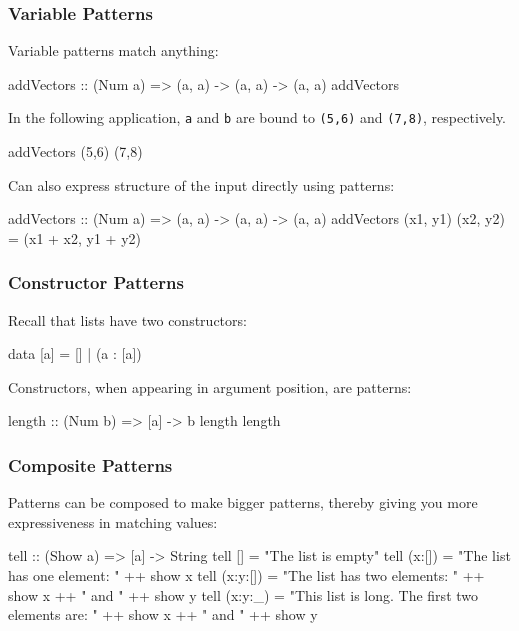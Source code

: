 \documentclass{beamer}
\newenvironment{codeblock}[1][.8]{%
\begin{columns}
\begin{column}{#1\linewidth}
\begin{exampleblock}{}}{%
\end{exampleblock}
\end{column}
\end{columns}}
\begin{document}
\begin{frame}[fragile]
\frametitle{Variable Patterns}

Variable patterns match anything:
\begin{hcode}
addVectors :: (Num a) => (a, a) -> (a, a) -> (a, a)  
addVectors %
\end{hcode}

\pause
\vfill
In the following application, \verb+a+ and \verb+b+ are bound to
 \verb+(5,6)+ and \verb+(7,8)+, respectively.
\begin{hcode}
addVectors (5,6) (7,8) 
\end{hcode}
\vfill

\pause 
Can also express structure of the input directly using patterns:
\begin{hcode}
addVectors :: (Num a) => (a, a) -> (a, a) -> (a, a)  
addVectors (x1, y1) (x2, y2) = (x1 + x2, y1 + y2)  
\end{hcode}

\end{frame}

\begin{frame}[fragile]
\frametitle{Constructor Patterns}

Recall that lists have two constructors:
\begin{hcode}
data [a] = [] | (a : [a])
\end{hcode}

\pause

Constructors, when appearing in argument position, are patterns:
\begin{hcode}
length :: (Num b) => [a] -> b  
length %
length %
\end{hcode}


\end{frame}

\begin{frame}[fragile]
\frametitle{Composite Patterns}

Patterns can be composed to make bigger patterns, thereby giving you more expressiveness in matching values:
\begin{hcode}
tell :: (Show a) => [a] -> String  
tell []       = "The list is empty"  
tell (x:[])   = "The list has one element: " ++ show x  
tell (x:y:[]) = "The list has two elements: " ++ show x ++ " and " ++ show y  
tell (x:y:_)  = "This list is long. The first two elements are: " ++ show x ++ " and " ++ show y
\end{hcode}


\end{frame}
\end{document}
